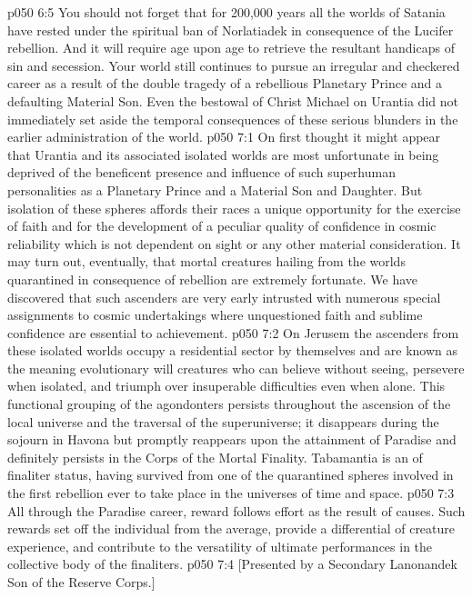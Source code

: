 \vs p050 6:5 \pc You should not forget that for 200,000 years all the worlds of Satania have rested under the spiritual ban of Norlatiadek in consequence of the Lucifer rebellion. And it will require age upon age to retrieve the resultant handicaps of sin and secession. Your world still continues to pursue an irregular and checkered career as a result of the double tragedy of a rebellious Planetary Prince and a defaulting Material Son. Even the bestowal of Christ Michael on Urantia did not immediately set aside the temporal consequences of these serious blunders in the earlier administration of the world.
\vs p050 7:1 On first thought it might appear that Urantia and its associated isolated worlds are most unfortunate in being deprived of the beneficent presence and influence of such superhuman personalities as a Planetary Prince and a Material Son and Daughter. But isolation of these spheres affords their races a unique opportunity for the exercise of faith and for the development of a peculiar quality of confidence in cosmic reliability which is not dependent on sight or any other material consideration. It may turn out, eventually, that mortal creatures hailing from the worlds quarantined in consequence of rebellion are extremely fortunate. We have discovered that such ascenders are very early intrusted with numerous special assignments to cosmic undertakings where unquestioned faith and sublime confidence are essential to achievement.
\vs p050 7:2 On Jerusem the ascenders from these isolated worlds occupy a residential sector by themselves and are known as the  meaning evolutionary will creatures who can believe without seeing, persevere when isolated, and triumph over insuperable difficulties even when alone. This functional grouping of the agondonters persists throughout the ascension of the local universe and the traversal of the superuniverse; it disappears during the sojourn in Havona but promptly reappears upon the attainment of Paradise and definitely persists in the Corps of the Mortal Finality. Tabamantia is an  of finaliter status, having survived from one of the quarantined spheres involved in the first rebellion ever to take place in the universes of time and space.
\vs p050 7:3 All through the Paradise career, reward follows effort as the result of causes. Such rewards set off the individual from the average, provide a differential of creature experience, and contribute to the versatility of ultimate performances in the collective body of the finaliters.
\vsetoff
\vs p050 7:4 [Presented by a Secondary Lanonandek Son of the Reserve Corps.]
\quizlink
